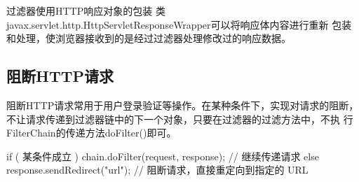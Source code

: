 
过滤器使用HTTP响应对象的包装
类javax.servlet.http.HttpServletResponseWrapper可以将响应体内容进行重新
包装和处理，使浏览器接收到的是经过过滤器处理修改过的响应数据。


\subsection{阻断HTTP请求} 

阻断HTTP请求常用于用户登录验证等操作。在某种条件下，实现对请求的阻断，
不让请求传递到过滤器链中的下一个对象，只要在过滤器的过滤方法中，不执
行FilterChain的传递方法doFilter()即可。

\begin{javaCode}
  if ( 某条件成立 ) {
    chain.doFilter(request, response); // 继续传递请求
  } else {
    response.sendRedirect("url"); // 阻断请求，直接重定向到指定的 URL
  }
\end{javaCode}

